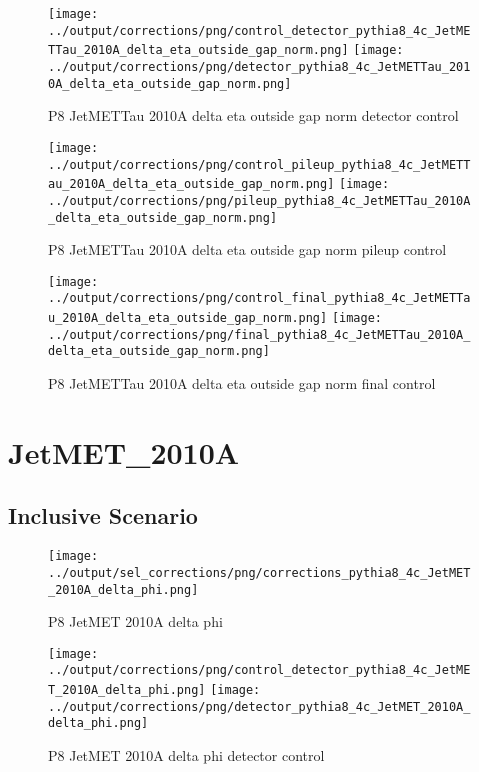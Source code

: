 \documentclass[11pt]{book}
\begin{document}
\begin{figure}[ht]
\centering
\texttt{[image: ../output/corrections/png/control\_detector\_pythia8\_4c\_JetMETTau\_2010A\_delta\_eta\_outside\_gap\_norm.png]}
\texttt{[image: ../output/corrections/png/detector\_pythia8\_4c\_JetMETTau\_2010A\_delta\_eta\_outside\_gap\_norm.png]}
\caption{P8 JetMETTau 2010A delta eta outside gap norm detector control}
\label{fig:p8_JetMETTau_2010A_delta_eta_outside_gap_norm_detector_control}
\end{figure}

\begin{figure}[ht]
\centering
\texttt{[image: ../output/corrections/png/control\_pileup\_pythia8\_4c\_JetMETTau\_2010A\_delta\_eta\_outside\_gap\_norm.png]}
\texttt{[image: ../output/corrections/png/pileup\_pythia8\_4c\_JetMETTau\_2010A\_delta\_eta\_outside\_gap\_norm.png]}
\caption{P8 JetMETTau 2010A delta eta outside gap norm pileup control}
\label{fig:p8_JetMETTau_2010A_delta_eta_outside_gap_norm_pileup_control}
\end{figure}


\begin{figure}[ht]
\centering
\texttt{[image: ../output/corrections/png/control\_final\_pythia8\_4c\_JetMETTau\_2010A\_delta\_eta\_outside\_gap\_norm.png]}
\texttt{[image: ../output/corrections/png/final\_pythia8\_4c\_JetMETTau\_2010A\_delta\_eta\_outside\_gap\_norm.png]}
\caption{P8 JetMETTau 2010A delta eta outside gap norm final control}
\label{fig:p8_JetMETTau_2010A_delta_eta_outside_gap_norm_final_control}
\end{figure}
\cleardoublepage

\section{JetMET\_2010A}

\subsection{Inclusive Scenario}
\begin{figure}[ht]
\centering
\texttt{[image: ../output/sel\_corrections/png/corrections\_pythia8\_4c\_JetMET\_2010A\_delta\_phi.png]}
\caption{P8 JetMET 2010A delta phi}
\label{fig:p8_JetMET_2010A_delta_phi}
\end{figure}

\begin{figure}[ht]
\centering
\texttt{[image: ../output/corrections/png/control\_detector\_pythia8\_4c\_JetMET\_2010A\_delta\_phi.png]}
\texttt{[image: ../output/corrections/png/detector\_pythia8\_4c\_JetMET\_2010A\_delta\_phi.png]}
\caption{P8 JetMET 2010A delta phi detector control}
\label{fig:p8_JetMET_2010A_delta_phi_detector_control}
\end{figure}
\end{document}
